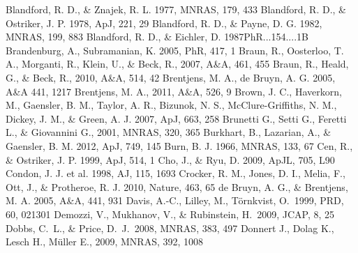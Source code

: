 \begin{thebibliography}{99}
\begin{multicols}{2}
{
	Blandford, R. D., \& Znajek, R. L. 1977, MNRAS, 179, 433
	Blandford, R. D., \& Ostriker, J. P. 1978, ApJ, 221, 29
	Blandford, R. D., \& Payne, D. G. 1982, MNRAS, 199, 883
	Blandford, R. D., \& Eichler, D. 1987PhR...154....1B
	Brandenburg, A., Subramanian, K. 2005, PhR, 417, 1
	Braun, R., Oosterloo, T. A., Morganti, R., Klein, U., \& Beck, R., 2007, A\&A, 461, 455
	Braun, R., Heald, G., \& Beck, R., 2010, A\&A, 514, 42
	Brentjens, M. A., de Bruyn, A. G. 2005, A\&A 441, 1217
	Brentjens, M. A., 2011, A\&A, 526, 9
	Brown, J. C., Haverkorn, M., Gaensler, B. M., Taylor, A. R., Bizunok, N. S., McClure-Griffiths, N. M., Dickey, J. M., \& Green, A. J. 2007, ApJ, 663, 258
	Brunetti G., Setti G., Feretti L., \& Giovannini G., 2001, MNRAS, 320, 365
	Burkhart, B., Lazarian, A., \& Gaensler, B. M. 2012, ApJ, 749, 145
	Burn, B. J. 1966, MNRAS, 133, 67
	Cen, R., \& Ostriker, J. P. 1999, ApJ, 514, 1
	Cho, J., \& Ryu, D. 2009, ApJL, 705, L90
	Condon, J. J. et al. 1998, AJ, 115, 1693
	Crocker, R. M., Jones, D. I., Melia, F., Ott, J., \& Protheroe, R. J. 2010, Nature, 463, 65
	de Bruyn, A. G., \& Brentjens, M. A. 2005, A\&A, 441, 931
	Davis, A.-C., Lilley, M., {T{\"o}rnkvist}, O.\ 1999, PRD, 60, 021301 
	Demozzi, V., Mukhanov, V., \& Rubinstein, H.\ 2009, JCAP, 8, 25
	Dobbs, C.~L., \& Price, D.~J.\ 2008, MNRAS, 383, 497 
    Donnert J., Dolag K., Lesch H., M\"uller E., 2009, MNRAS, 392, 1008
}
\end{multicols}
\end{thebibliography}
